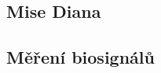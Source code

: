 \subsection{Mise Diana}
\label{subsec:mise_diana}

\subsection{Měření biosignálů}
\label{subsec:_mereni_biosignalu}

